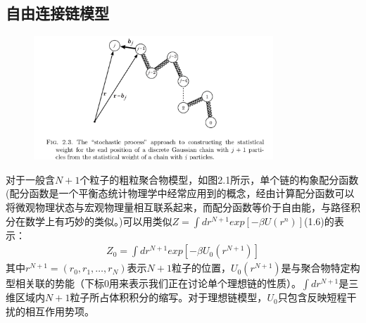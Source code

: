 \subsection{自由连接链模型}
\begin{figure}
				\caption{ }
				\centering
				\includegraphics[width=9cm]{./figures/1.png}
			\end{figure}
对于一般含$N+1$个粒子的粗粒聚合物模型，如图2.1所示，单个链的构象配分函数(配分函数是一个平衡态统计物理学中经常应用到的概念，经由计算配分函数可以将微观物理状态与宏观物理量相互联系起来，而配分函数等价于自由能，与路径积分在数学上有巧妙的类似。)可以用类似$Z=\int dr^{N+1}exp[-\beta U(r^{n})]$(1.6)的表示：\\
\begin{gather}
Z_0 = \int dr^{N+1}exp[-\beta U_{0}(r^{N+1})]
\end{gather}
其中$r^{N+1}=(r_0,r_1,\ldots,r_{N})$表示$N+1$粒子的位置，$U_0(r^{N+1})$是与聚合物特定构型相关联的势能（下标$0$用来表示我们正在讨论单个理想链的性质）。$\int dr^{N+1}$是三维区域内$N+1$粒子所占体积积分的缩写。对于理想链模型，$U_0$只包含反映短程干扰的相互作用势项。\\

